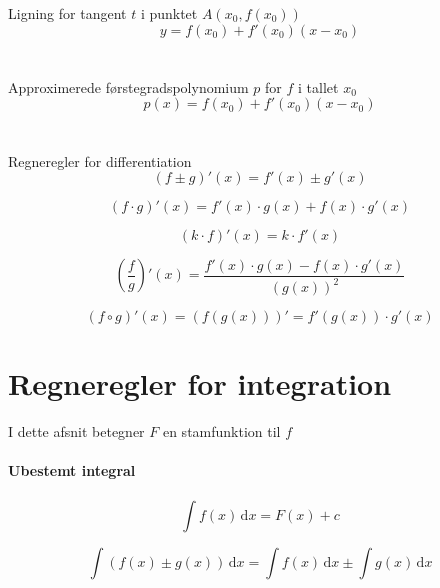 \documentclass[11pt,a5paper,fleqn,leqno]{book}
\begin{document}
Ligning for tangent $t$ i punktet $A(x_0,f(x_0))$
\begin{equation}
y = f(x_0) + f'(x_0)(x-x_0)
\end{equation}
\\
\\
Approximerede førstegradspolynomium $p$ for $f$ i tallet $x_0$
\begin{equation}
p(x) = f(x_0) + f'(x_0)(x-x_0)
\end{equation}
\\
\\
Regneregler for differentiation
\begin{equation}
\left(f \pm g\right)'(x) = f'(x) \pm g'(x)
\end{equation}

\begin{equation}
\left(f \cdot g\right)'(x) = f'(x) \cdot g(x) + f(x) \cdot g'(x)
\end{equation}

\begin{equation}
\left(k \cdot f\right)'(x) = k \cdot f'(x)
\end{equation}

\begin{equation}
\left(\frac{f}{g}\right)'(x) = \frac{f'(x) \cdot g(x) - f(x) \cdot g'(x)}{\left(g(x)\right)^2}
\end{equation}

\begin{equation}
\left(f \circ g\right)'(x) = \left(f\left(g(x)\right)\right)' = f'\left(g(x)\right) \cdot g'(x)
\end{equation}

\section{Regneregler for integration}

I dette afsnit betegner $F$ en stamfunktion til $f$

\paragraph{Ubestemt integral}

\begin{equation}
\int f(x)\, \mathrm{d}x = F(x) + c
\end{equation}

\begin{equation}
\int \left(f(x) \pm g(x)\right)\, \mathrm{d}x = \int f(x)\, \mathrm{d}x \pm \int g(x)\, \mathrm{d}x
\end{equation}
\end{document}
